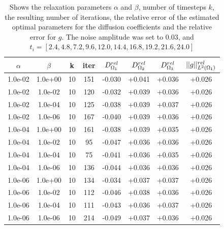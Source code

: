 \documentclass[11pt,a4paper]{article}
\begin{document}
\newpage
\begin{table}
\centering
\caption{Shows the relaxation parameters $\alpha$ and $\beta$, number of timesteps $k$, the resulting number of iterations, the relative error of the estimated optimal parameters for the diffusion coefficients and the relative error for $g$. The noise amplitude was set to 0.03, and $ t_i=[2.4, 4.8, 7.2, 9.6, 12.0, 14.4, 16.8, 19.2, 21.6, 24.0]$ }
\begin{tabular}{*{8}c}
$\alpha$ & $\beta$ & k  & iter & $ D_{\Omega_1}\sp{rel} $ & $D_{\Omega_2}\sp{rel}$ & $D_{\Omega_3}\sp{rel}$ & $|| g ||\sp{rel}_{L\sp{2}(\Omega_1)} $\\
\hline
 1.0e-02 	 & 1.0e+00 	 & 10 & 151 	 & -0.030 & +0.041 & +0.036 & +0.026 \\ 
 1.0e-02 	 & 1.0e-02 	 & 10 & 120 	 & -0.032 & +0.039 & +0.036 & +0.026 \\ 
 1.0e-02 	 & 1.0e-04 	 & 10 & 125 	 & -0.038 & +0.039 & +0.037 & +0.026 \\ 
 1.0e-02 	 & 1.0e-06 	 & 10 & 167 	 & -0.040 & +0.039 & +0.036 & +0.026 \\ 
 1.0e-04 	 & 1.0e+00 	 & 10 & 161 	 & -0.038 & +0.039 & +0.035 & +0.026 \\ 
 1.0e-04 	 & 1.0e-02 	 & 10 & 95 	 & -0.047 & +0.036 & +0.036 & +0.026 \\ 
 1.0e-04 	 & 1.0e-04 	 & 10 & 75 	 & -0.041 & +0.036 & +0.035 & +0.026 \\ 
 1.0e-04 	 & 1.0e-06 	 & 10 & 136 	 & -0.044 & +0.036 & +0.036 & +0.026 \\ 
 1.0e-06 	 & 1.0e+00 	 & 10 & 134 	 & -0.034 & +0.037 & +0.037 & +0.026 \\ 
 1.0e-06 	 & 1.0e-02 	 & 10 & 112 	 & -0.046 & +0.038 & +0.036 & +0.026 \\ 
 1.0e-06 	 & 1.0e-04 	 & 10 & 111 	 & -0.043 & +0.036 & +0.037 & +0.026 \\ 
 1.0e-06 	 & 1.0e-06 	 & 10 & 214 	 & -0.049 & +0.037 & +0.036 & +0.026 \\
  

\end{tabular}
\end{table}
\end{document}
